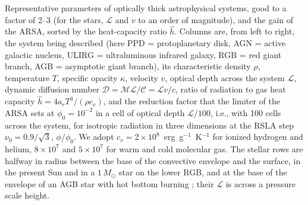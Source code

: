 \begin{table}
    \caption{Representative parameters of optically thick astrophysical systems, good to a factor of 2--3 (for the stars, $\mathcal{L}$ and $v$ to an order of magnitude), and the gain of the ARSA, sorted by the heat-capacity ratio $\hat{h}$. Columns are, from left to right, the system being described (here PPD = protoplanetary disk, AGN = active galactic nucleus, ULIRG = ultraluminous infrared galaxy, RGB = red giant branch, AGB = asymptotic giant branch), its characteristic density $\rho$, temperature $T$, specific opacity $\kappa$, velocity $v$, optical depth across the system $\mathcal{L}$, dynamic diffusion number $\mathcal{D} = \mathcal{M}\mathcal{L}/\mathcal{C} = \mathcal{L}v/c$, ratio of radiation to gas heat capacity $\hat{h} = 4a_rT^3/(\rho c_v)$, and the reduction factor that the limiter of the ARSA sets at $\phi_0 = 10^{-2}$ in a cell of optical depth $\mathcal{L}/100$, i.e., with 100 cells across the system, for isotropic radiation in three dimensions at the RSLA step $\nu_0 = 0.9/\sqrt{3}$, $\phi/\phi_0$. We adopt $c_v = 2\times10^8$~erg~g$^{-1}$~K$^{-1}$ for ionized hydrogen and helium, $8\times10^7$ and $5\times10^7$ for warm and cold molecular gas. The stellar rows are halfway in radius between the base of the convective envelope and the surface, in the present Sun \citep{ChristensenDalsgaard96a} and in a $1\,M_\odot$ star on the lower RGB, and at the base of the envelope of an AGB star with hot bottom burning \citep{Karakas14b, Doherty17a}; their $\mathcal{L}$ is across a pressure scale height.
    \label{tab:media}
    }
\end{table}
